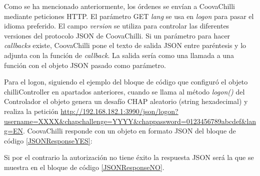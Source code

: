 Como se ha mencionado anteriormente, los órdenes se envían a CoovaChilli mediante peticiones HTTP. El parámetro GET \emph{lang} se usa en \emph{logon} para pasar el idioma preferido. El campo \emph{version} se utiliza para controlar las diferentes versiones del protocolo JSON de CoovaChilli. Si un parámetro para hacer \emph{callbacks} existe, CoovaChilli pone el texto de salida JSON entre paréntesis y lo adjunta con la función de \emph{callback}. La salida sería como una llamada a una función con el objeto JSON pasado como parámetro.

Para el logon, siguiendo el ejemplo del bloque de código que configuró el objeto chilliController en apartados anteriores, cuando se llama al método \emph{logon()} del Controlador el objeto genera un desafío CHAP aleatorio (string hexadecimal) y realiza la petición \url{http://192.168.182.1:3990/json/logon?username=XXXX&chapchallenge=YYYY&chappassword=0123456789abcdef&lang=EN}.
CoovaChilli responde con un objeto en formato JSON del bloque de código \ref{JSONResponseYES}:


Si por el contrario la autorización no tiene éxito la respuesta JSON será la que se muestra en el bloque de código \ref{JSONResponseNO}.

